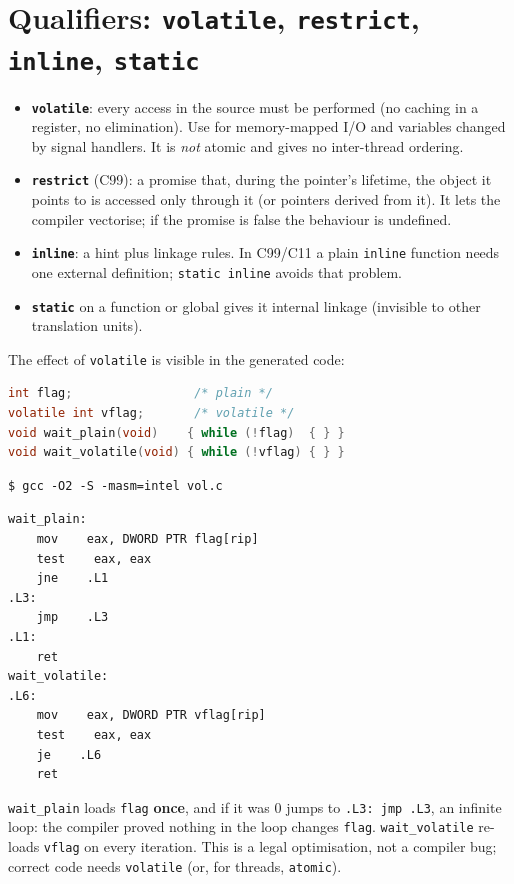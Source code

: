 \documentclass[10pt,a4paper,openany,oneside]{report}
\newcommand{\prio}[1]{\texorpdfstring{\ifcase#1\or{\color{gold}\ding{72}}\or{\color{gold}\ding{72}\ding{72}}\or{\color{gold}\ding{72}\ding{72}\ding{72}}\fi}{}}
\begin{document}
\section{Qualifiers: \texttt{volatile}, \texttt{restrict}, \texttt{inline}, \texttt{static} \prio{2}}
\begin{itemize}
\item \textbf{\texttt{volatile}}: every access in the source must be performed (no caching in a register, no elimination). Use for memory-mapped I/O and variables changed by signal handlers. It is \emph{not} atomic and gives no inter-thread ordering.
\item \textbf{\texttt{restrict}} (C99): a promise that, during the pointer's lifetime, the object it points to is accessed only through it (or pointers derived from it). It lets the compiler vectorise; if the promise is false the behaviour is undefined.
\item \textbf{\texttt{inline}}: a hint plus linkage rules. In C99/C11 a plain \texttt{inline} function needs one external definition; \texttt{static inline} avoids that problem.
\item \textbf{\texttt{static}} on a function or global gives it internal linkage (invisible to other translation units).
\end{itemize}
The effect of \texttt{volatile} is visible in the generated code:
\begin{lstlisting}[language={C}]
int flag;                 /* plain */
volatile int vflag;       /* volatile */
void wait_plain(void)    { while (!flag)  { } }
void wait_volatile(void) { while (!vflag) { } }
\end{lstlisting}
\begin{lstlisting}[style=shcmd]
$ gcc -O2 -S -masm=intel vol.c
\end{lstlisting}
\begin{lstlisting}[style=out]
wait_plain:
    mov    eax, DWORD PTR flag[rip]
    test    eax, eax
    jne    .L1
.L3:
    jmp    .L3
.L1:
    ret
wait_volatile:
.L6:
    mov    eax, DWORD PTR vflag[rip]
    test    eax, eax
    je    .L6
    ret
\end{lstlisting}
\begin{trapbox}
\texttt{wait\_plain} loads \texttt{flag} \textbf{once}, and if it was 0 jumps to \texttt{.L3: jmp .L3}, an infinite loop: the compiler proved nothing in the loop changes \texttt{flag}. \texttt{wait\_volatile} re-loads \texttt{vflag} on every iteration. This is a legal optimisation, not a compiler bug; correct code needs \texttt{volatile} (or, for threads, \texttt{atomic}).
\end{trapbox}
\end{document}
